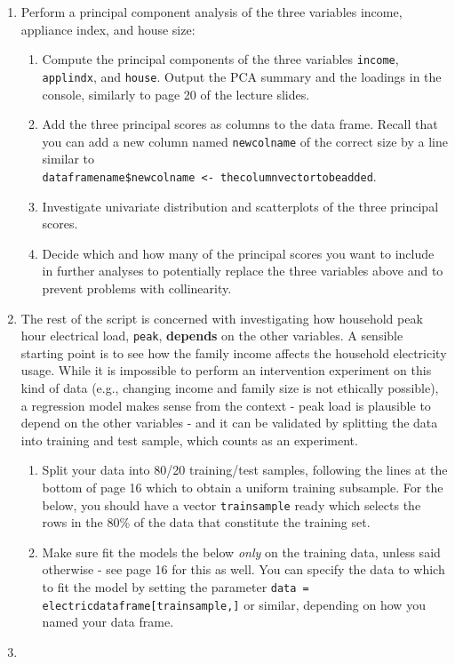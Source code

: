 \begin{enumerate}
\item Perform a principal component analysis of the three variables income, appliance index, and house size:
\begin{enumerate}
\item Compute the principal components of the three variables {\tt income}, {\tt applindx}, and {\tt house}. Output the PCA summary and the loadings in the console, similarly to page 20 of the lecture slides.
\item Add the three principal scores as columns to the data frame. Recall that you can add a new column named \texttt{newcolname} of the correct size by a line similar to\\ \texttt{dataframename\$newcolname <- thecolumnvectortobeadded}.
\item Investigate univariate distribution and scatterplots of the three principal scores.
\item Decide which and how many of the principal scores you want to include in further analyses to potentially replace the three variables above and to prevent problems with collinearity.
\end{enumerate}
\newpage
\item The rest of the script is concerned with investigating how household peak hour electrical load, {\tt peak}, {\bf depends} on the other variables. A sensible starting point is to see how the family income affects the household electricity usage. While it is impossible to perform an intervention experiment on this kind of data (e.g., changing income and family size is not ethically possible), a regression model makes sense from the context - peak load is plausible to depend on the other variables - and it can be validated by splitting the data into training and test sample, which counts as an experiment.
    \begin{enumerate}
     \item Split your data into 80/20 training/test samples, following the lines at the bottom of page 16 which to obtain a uniform training subsample. For the below, you should have a vector \texttt{trainsample} ready which selects the rows in the 80\% of the data that constitute the training set.
         
     \item Make sure fit the models the below \emph{only} on the training data, unless said otherwise - see page 16 for this as well. You can specify the data to which to fit the model by setting the parameter \texttt{data = electricdataframe[trainsample,]} or similar, depending on how you named your data frame.
    \end{enumerate}
\item


\end{enumerate}
